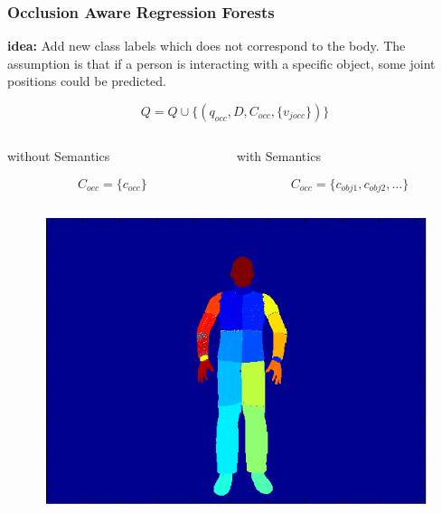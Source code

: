 \documentclass[xcolor=dvipsnames]{beamer}
\begin{document}
\begin{frame}
	\frametitle{Occlusion Aware Regression Forests}
	\textbf{idea:} Add new class labels which does not correspond to the body.
	The assumption is that if a person is interacting with a specific object, some joint positions could be predicted.
	 
	\begin{equation*}
		Q = Q \cup \{(q_{occ}, D, C_{occ}, \{v_{jocc}\})\}
	\end{equation*}
	
	\vspace{.5cm}
	\begin{columns}
		\begin{column}{.5\textwidth}
			\begin{center}
				without Semantics
			\end{center}
			\begin{equation*}
				C_{occ} = \{c_{occ}\}
			\end{equation*}
		\end{column}
		\begin{column}{.5\textwidth}
			\begin{center}
				with Semantics
			\end{center}
			\begin{equation*}
				C_{occ} = \{c_{obj1}, c_{obj2}, ...\}
			\end{equation*}
		\end{column}
	\end{columns}
	\vspace{.5cm}
	\begin{columns}
		\begin{column}{.33\textwidth}
			\begin{figure}
				\includegraphics[width=\textwidth]{img/oarf1.png}

\end{figure}
\end{column}
\end{columns}
\end{frame}
\end{document}
